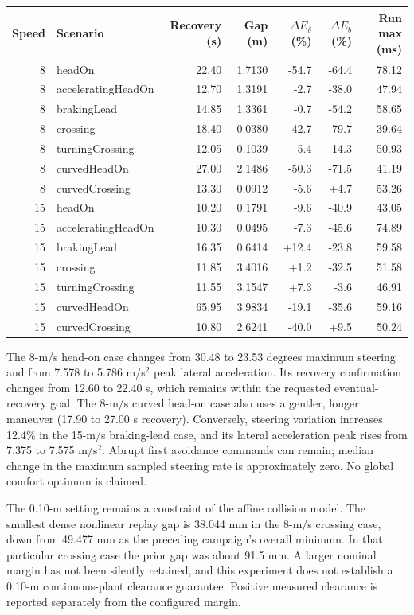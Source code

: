 \documentclass[10pt]{article}
\begin{document}
\begin{center}\small
\begin{tabular}{rlrrrrr}
\toprule
Speed & Scenario & Recovery (s) & Gap (m) & $\Delta E_\delta$ (\%) & $\Delta E_b$ (\%) & Run max (ms)\\
\midrule
8 & headOn & 22.40 & 1.7130 & -54.7 & -64.4 & 78.12 \\
8 & acceleratingHeadOn & 12.70 & 1.3191 & -2.7 & -38.0 & 47.94 \\
8 & brakingLead & 14.85 & 1.3361 & -0.7 & -54.2 & 58.65 \\
8 & crossing & 18.40 & 0.0380 & -42.7 & -79.7 & 39.64 \\
8 & turningCrossing & 12.05 & 0.1039 & -5.4 & -14.3 & 50.93 \\
8 & curvedHeadOn & 27.00 & 2.1486 & -50.3 & -71.5 & 41.19 \\
8 & curvedCrossing & 13.30 & 0.0912 & -5.6 & +4.7 & 53.26 \\
15 & headOn & 10.20 & 0.1791 & -9.6 & -40.9 & 43.05 \\
15 & acceleratingHeadOn & 10.30 & 0.0495 & -7.3 & -45.6 & 74.89 \\
15 & brakingLead & 16.35 & 0.6414 & +12.4 & -23.8 & 59.58 \\
15 & crossing & 11.85 & 3.4016 & +1.2 & -32.5 & 51.58 \\
15 & turningCrossing & 11.55 & 3.1547 & +7.3 & -3.6 & 46.91 \\
15 & curvedHeadOn & 65.95 & 3.9834 & -19.1 & -35.6 & 59.16 \\
15 & curvedCrossing & 10.80 & 2.6241 & -40.0 & +9.5 & 50.24 \\
\bottomrule
\end{tabular}
\end{center}
The 8-m/s head-on case changes from 30.48 to 23.53 degrees maximum steering
and from 7.578 to 5.786 m/s$^2$ peak lateral acceleration. Its recovery
confirmation changes from 12.60 to 22.40 s, which remains within the requested
eventual-recovery goal. The 8-m/s curved head-on case also uses a gentler,
longer maneuver (17.90 to 27.00 s recovery). Conversely, steering variation
increases 12.4\% in the 15-m/s braking-lead case, and its lateral acceleration
peak rises from 7.375 to 7.575 m/s$^2$. Abrupt first avoidance commands can
remain; median change in the maximum sampled steering rate is approximately
zero. No global comfort optimum is claimed.

The 0.10-m setting remains a constraint of the affine collision model. The
smallest dense nonlinear replay gap is 38.044 mm in the 8-m/s crossing case,
down from 49.477 mm as the preceding campaign's overall minimum. In that
particular crossing case the prior gap was about 91.5 mm. A larger nominal
margin has not been silently retained, and this experiment does not establish
a 0.10-m continuous-plant clearance guarantee. Positive measured clearance
is reported separately from the configured margin.
\end{document}
